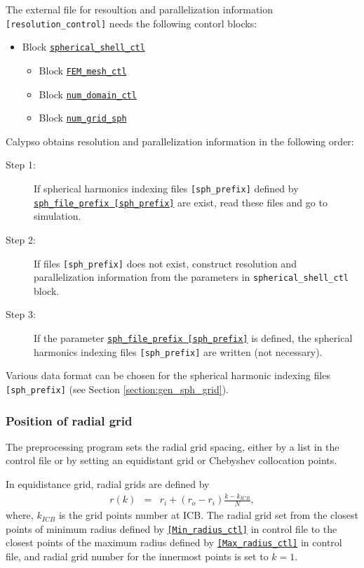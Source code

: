The external file for resoultion and parallelization information \verb|[resolution_control]| needs the following contorl blocks:
%
	\begin{itemize}
	\item Block \hyperref[href_i:spherical_shell_ctl]{\tt spherical\_shell\_ctl}
		\begin{itemize}
		\item Block \hyperref[href_i:FEM_mesh_ctl]{\tt FEM\_mesh\_ctl}
		\item Block \hyperref[href_i:num_domain_ctl]{\tt num\_domain\_ctl}
		\item Block \hyperref[href_i:num_grid_sph]{\tt num\_grid\_sph}
		\end{itemize}
	\end{itemize}
%
%
Calypso obtains resolution and parallelization information in the following order:
\begin{description}
\item[Step 1:] If spherical harmonics indexing files {\tt  [sph\_prefix]} defined by
\hyperref[href_t:sph_file_prefix]{\tt sph\_file\_prefix    [sph\_prefix]}  are exist, read these files and go to simulation.
\item[Step 2:] If files  {\tt  [sph\_prefix]} does not exist, construct resolution and parallelization information from the parameters in \verb|spherical_shell_ctl| block.
\item[Step 3:] If the parameter \hyperref[href_t:sph_file_prefix]{\tt sph\_file\_prefix    [sph\_prefix]}  is defined, the spherical harmonics indexing files {\tt  [sph\_prefix]} are written (not necessary). 
\end{description}
%
Various data format can be chosen for the spherical harmonic indexing files  {\tt  [sph\_prefix]} (see Section \ref{section:gen_sph_grid}).
%
\subsubsection{Position of radial grid}
The preprocessing program sets the radial grid spacing, either by a list in the control file or by setting an equidistant grid or Chebyshev collocation points.

In equidistance grid, radial grids are defined by
%
\begin{eqnarray}
r(k) & = & r_{i} + \left(r_{o}-r_{i} \right) \frac{k-k_{ICB}}{N},
\nonumber
\end{eqnarray}
%
where, $k_{ICB}$ is the grid points number at ICB. The radial grid set from the closest points of minimum radius defined by \hyperref[href_i:Min_radius_ctl]{\tt [Min\_radius\_ctl]} in control file to the closest points of the maximum radius defined by \hyperref[href_i:Max_radius_ctl]{\tt [Max\_radius\_ctl]} in control file, and radial grid number for the innermost points is set to $k = 1$.


